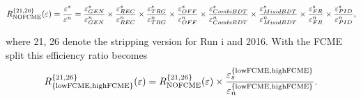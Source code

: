 \hspace*{-1.0cm}\begin{equation}
	R_{\rm{NOFCME}}^{\{21,26\}}(\varepsilon)=\frac{\varepsilon^{s}}{\varepsilon^{n}}=\frac{\varepsilon_{GEN}^{s}}{\varepsilon_{GEN}^{n}} \times \frac{\varepsilon_{REC}^{s}}{\varepsilon_{REC}^{n}} \times \frac{\varepsilon_{TRG}^{s}}{\varepsilon_{TRG}^{n}} \times \frac{\varepsilon_{OFF}^{s}}{\varepsilon_{OFF}^{n}} \times \frac{\varepsilon_{CombiBDT}^{s}}{\varepsilon_{CombiBDT}^{n}} \times \frac{\varepsilon_{MisidBDT}^{s}}{\varepsilon_{MisidBDT}^{n}} \times \frac{\varepsilon_{FR}^{s}}{\varepsilon_{FR}^{n}} \times \frac{\varepsilon_{PID}^{s}}{\varepsilon_{PID}^{n}},
\label{eq:notsplitted}
\end{equation}



\noindent where 21, 26 denote the stripping version for Run \Rn{1} and 2016. With the FCME split this efficiency ratio becomes
\begin{equation}
	R^{\{21,26\}}_{\mathrm{\{lowFCME,highFCME\}}}(\varepsilon)=R_{\rm{NOFCME}}^{\{21,26\}}(\varepsilon)\times\frac{\varepsilon^{\mathrm{\{lowFCME,highFCME\}}}_{s}}{\varepsilon^{\mathrm{\{lowFCME,highFCME\}}}_{n}}.
\label{eq:splitted}
\end{equation}

